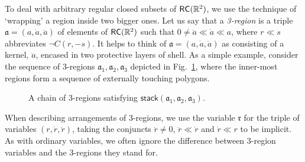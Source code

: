 \documentclass{article}
\newcommand{\R}{\mathbb{R}}
\newcommand{\RC}{{\sf RC}}
\newcommand{\tseq}[1]{\mathfrak{#1}}
\newcommand{\intermediate}[1]{\dot{#1}}
\newcommand{\inner}[1]{\ddot{#1}}
\newcommand{\stack}{\mathsf{stack}}
\begin{document}
To deal with arbitrary regular closed subsets of $\RC(\R^2)$, we use
the technique of `wrapping' a region inside two bigger ones. Let us
say that a \emph{3-region} is a triple $\tseq{a} =
(a,\intermediate{a},\inner{a})$ of elements of $\RC(\R^2)$ such that
$0 \neq \inner{a} \ll \intermediate{a} \ll a$, where $r \ll s$
abbreviates $\neg C(r, -s)$. It helps to think of $\tseq{a} =
(a,\intermediate{a},\inner{a})$ as consisting of a kernel,
$\inner{a}$, encased in two protective layers of shell. As a simple
example, consider the sequence of 3-regions $\tseq{a}_1, \tseq{a}_2,
\tseq{a}_3$ depicted in Fig.~\ref{fig:stack}, where the inner-most
regions form a sequence of externally touching polygons.
\begin{figure}[h]
\begin{center}
\end{center}
\vspace*{-2mm}
\caption{A chain of 3-regions satisfying $\stack(\tseq{a}_1,
\tseq{a}_2, \tseq{a}_3)$.
}\label{fig:stack}
\end{figure}
When describing arrangements of 3-regions, we use the variable
$\tseq{r}$ for the triple of variables $(r, \intermediate{r},
\inner{r})$, taking the conjuncts $\inner{r} \neq 0$, $\inner{r} \ll
\intermediate{r}$ and $\intermediate{r} \ll r$ to be implicit. As with
ordinary variables, we often ignore the difference between 3-region
variables and the 3-regions they stand for.
\end{document}
